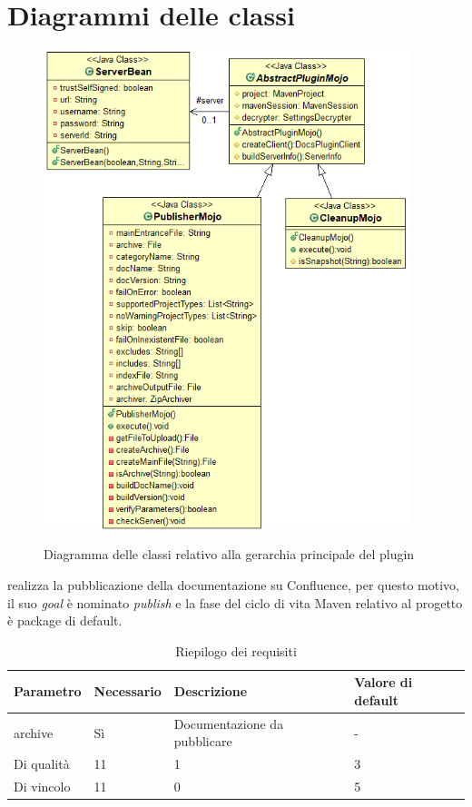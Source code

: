 \section{Diagrammi delle classi}
\label{sec:diagrammi-classi}

\begin{figure}[H]
    \centering
    \includegraphics[width=0.95\textwidth]{immagini/mojo-gerarchy.png}\\
    \caption{Diagramma delle classi relativo alla gerarchia principale del plugin}
\end{figure}

 realizza la pubblicazione della documentazione su Confluence, per questo motivo, il suo \emph{goal} è nominato \emph{publish} e la fase del ciclo di vita Maven relativo al progetto è package di default.

\begin{table}[H]
    \centering
    {\def\arraystretch{1.7}
    \begin{tabularx}{\textwidth}{XXXX}
        \rowcolor{beautyblue} \textbf{Parametro} & \textbf{Necessario} & \textbf{Descrizione} & \textbf{Valore di default} \\\toprule
        archive & Sì & Documentazione da pubblicare & - \\
        Di qualità & 11 & 1 & 3 \\
        Di vincolo & 11 & 0 & 5
        \\\bottomrule
    \end{tabularx}}
    \caption{Riepilogo dei requisiti}
\end{table}

